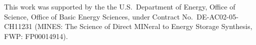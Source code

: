\documentclass[aps,prl,twocolumn,10pt,superscriptaddress,floatfix]{revtex4-2}
\begin{document}
\begin{acknowledgments}
This work was supported by the the U.S.\ Department of Energy, Office of Science, 
Office of Basic Energy Sciences, under Contract No.\ DE-AC02-05-CH11231 
(MINES: The Science of Direct MINeral to Energy Storage Synthesis, FWP: FP00014914).
\end{acknowledgments}


\end{document}
